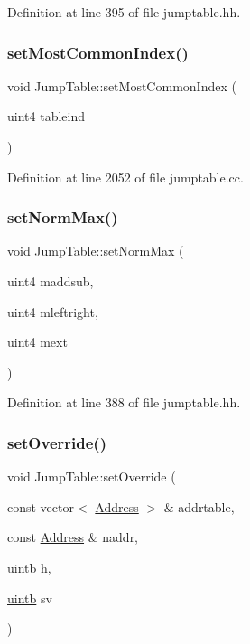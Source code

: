 Definition at line 395 of file jumptable.\+hh.

\mbox{\label{class_jump_table_a0537814cab892d9a6fa6342cd4b2f1fd}} 
\subsubsection{\texorpdfstring{setMostCommonIndex()}{setMostCommonIndex()}}
{\footnotesize\ttfamily void Jump\+Table\+::set\+Most\+Common\+Index (\begin{DoxyParamCaption}\item[{uint4}]{tableind }\end{DoxyParamCaption})}



Definition at line 2052 of file jumptable.\+cc.

\mbox{\label{class_jump_table_a436e2a0d77555f2f69edc3e7c0ca5227}} 
\subsubsection{\texorpdfstring{setNormMax()}{setNormMax()}}
{\footnotesize\ttfamily void Jump\+Table\+::set\+Norm\+Max (\begin{DoxyParamCaption}\item[{uint4}]{maddsub,  }\item[{uint4}]{mleftright,  }\item[{uint4}]{mext }\end{DoxyParamCaption})\hspace{0.3cm}{\ttfamily [inline]}}



Definition at line 388 of file jumptable.\+hh.

\mbox{\label{class_jump_table_a3e013d86f11f8df367c3979dd6310163}} 
\subsubsection{\texorpdfstring{setOverride()}{setOverride()}}
{\footnotesize\ttfamily void Jump\+Table\+::set\+Override (\begin{DoxyParamCaption}\item[{const vector$<$ \mbox{\hyperlink{class_address}{Address}} $>$ \&}]{addrtable,  }\item[{const \mbox{\hyperlink{class_address}{Address}} \&}]{naddr,  }\item[{\mbox{\hyperlink{types_8h_a2db313c5d32a12b01d26ac9b3bca178f}{uintb}}}]{h,  }\item[{\mbox{\hyperlink{types_8h_a2db313c5d32a12b01d26ac9b3bca178f}{uintb}}}]{sv }\end{DoxyParamCaption})}



